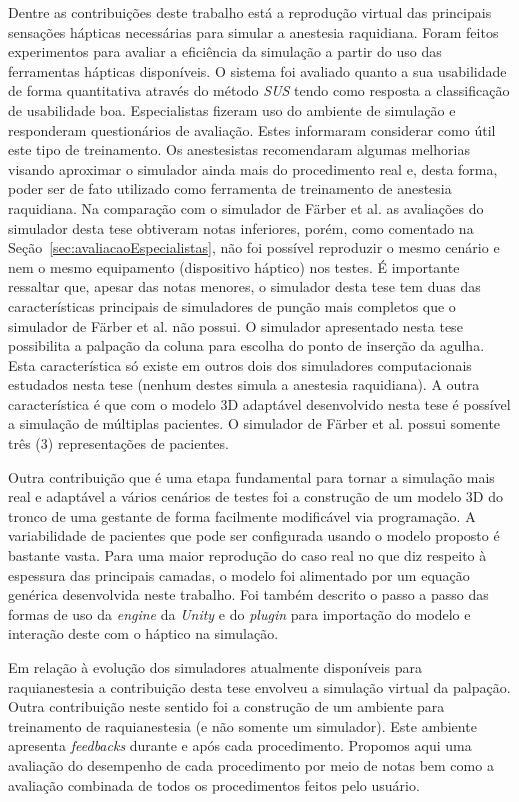 Dentre as contribuições deste trabalho está a reprodução virtual das principais sensações hápticas necessárias para simular a anestesia raquidiana. Foram feitos experimentos para avaliar a eficiência da simulação a partir do uso das ferramentas hápticas disponíveis. O sistema foi avaliado quanto a sua usabilidade de forma quantitativa através do método \textit{\acrshort{SUS}} \cite{Brooke2013} tendo como resposta a classificação de usabilidade boa. Especialistas fizeram uso do ambiente de simulação e responderam questionários de avaliação. Estes informaram considerar como útil este tipo de treinamento. Os anestesistas recomendaram algumas melhorias visando aproximar o simulador ainda mais do procedimento real e, desta forma, poder ser de fato utilizado como ferramenta de treinamento de anestesia raquidiana. Na comparação com o simulador de Färber et al. \cite{Farber2008} as avaliações do simulador desta tese obtiveram notas inferiores, porém, como comentado na Seção~\ref{sec:avaliacaoEspecialistas}, não foi possível reproduzir o mesmo cenário e nem o mesmo equipamento (dispositivo háptico) nos testes. É importante ressaltar que, apesar das notas menores, o simulador desta tese tem duas das características principais de simuladores de punção mais completos que o simulador de Färber et al. \cite{Farber2008} não possui. O simulador apresentado nesta tese possibilita a palpação da coluna para escolha do ponto de inserção da agulha. Esta característica só existe em outros dois dos simuladores computacionais estudados nesta tese (nenhum destes simula a anestesia raquidiana). A outra característica é que com o modelo 3D adaptável desenvolvido nesta tese é possível a simulação de múltiplas pacientes. O simulador de Färber et al. \cite{Farber2008} possui somente três (3) representações de pacientes.

Outra contribuição que é uma etapa fundamental para tornar a simulação mais real e adaptável a vários cenários de testes foi a construção de um modelo 3D do tronco de uma gestante de forma facilmente modificável via programação. A variabilidade de pacientes que pode ser configurada usando o modelo proposto é bastante vasta. Para uma maior reprodução do caso real no que diz respeito à espessura das principais camadas, o modelo foi alimentado por um equação genérica desenvolvida neste trabalho. Foi também descrito o passo a passo das formas de uso da \textit{engine} da \textit{Unity} e do \textit{plugin} para importação do modelo e interação deste com o háptico na simulação. 

Em relação à evolução dos simuladores atualmente disponíveis para raquianestesia a contribuição desta tese envolveu a simulação virtual da palpação. Outra contribuição neste sentido foi a construção de um ambiente para treinamento de raquianestesia (e não somente um simulador). Este ambiente apresenta \textit{feedbacks} durante e após cada procedimento. Propomos aqui uma avaliação do desempenho de cada procedimento por meio de notas bem como a avaliação combinada de todos os procedimentos feitos pelo usuário. 

